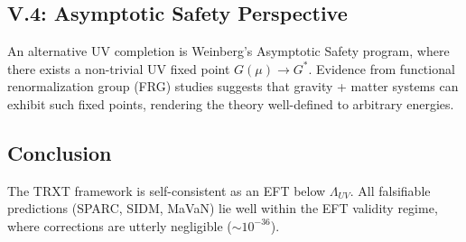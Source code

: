 \subsection{V.4: Asymptotic Safety Perspective}

An alternative UV completion is Weinberg's Asymptotic Safety program, where there exists a non-trivial UV fixed point $G(\mu) \to G^*$. Evidence from functional renormalization group (FRG) studies suggests that gravity + matter systems can exhibit such fixed points, rendering the theory well-defined to arbitrary energies.

\subsection{Conclusion}
The TRXT framework is self-consistent as an EFT below $\Lambda_{UV}$. All falsifiable predictions (SPARC, SIDM, MaVaN) lie well within the EFT validity regime, where corrections are utterly negligible ($\sim 10^{-36}$).
